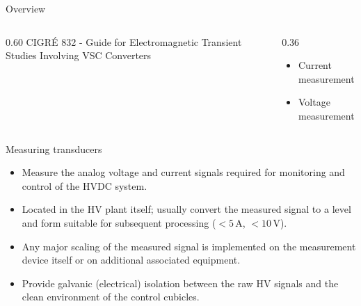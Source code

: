 
\begin{frame}{Overview}
  \begin{columns}[c,onlytextwidth]
    \begin{column}{0.60\textwidth}
      \centering
      {\color{atGray}\footnotesize CIGR\'E 832 - Guide for Electromagnetic Transient Studies Involving VSC Converters}
    \end{column}
    \begin{column}{0.36\textwidth}
      \begin{itemize}
        \setlength{\itemsep}{0.5em}
        \item Current measurement
        \item Voltage measurement
      \end{itemize}
      \vspace{0.4em}

    \end{column}
  \end{columns}
\end{frame}

\begin{frame}{Measuring transducers}
  \begin{itemize}
    \setlength{\itemsep}{0.5em}
    \item Measure the analog voltage and current signals required for
          monitoring and control of the HVDC system.
    \item Located in the HV plant itself; usually convert the measured
          signal to a level and form suitable for subsequent processing
          ($<5$\,A, $<10$\,V).
    \item Any major scaling of the measured signal is implemented on the
          measurement device itself or on additional associated equipment.
    \item Provide galvanic (electrical) isolation between the raw HV signals
          and the clean environment of the control cubicles.
  \end{itemize}
\end{frame}


